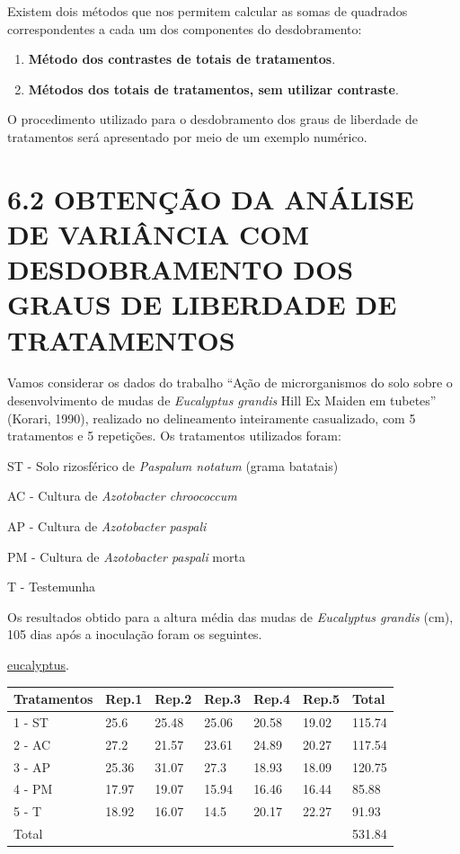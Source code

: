 \documentclass[
]{book}
\providecommand{\tightlist}{%
  \setlength{\itemsep}{0pt}\setlength{\parskip}{0pt}}
\begin{document}
Existem dois métodos que nos permitem calcular as somas de quadrados correspondentes a cada um dos componentes do desdobramento:

\begin{enumerate}
\def\labelenumi{\arabic{enumi}.}
\tightlist
\item
  \textbf{Método dos contrastes de totais de tratamentos}.
\item
  \textbf{Métodos dos totais de tratamentos, sem utilizar contraste}.
\end{enumerate}

O procedimento utilizado para o desdobramento dos graus de liberdade de tratamentos será apresentado por meio de um exemplo numérico.

\hypertarget{obtenuxe7uxe3o-da-anuxe1lise-de-variuxe2ncia-com-desdobramento-dos-graus-de-liberdade-de-tratamentos}{%
\section{6.2 OBTENÇÃO DA ANÁLISE DE VARIÂNCIA COM DESDOBRAMENTO DOS GRAUS DE LIBERDADE DE TRATAMENTOS}\label{obtenuxe7uxe3o-da-anuxe1lise-de-variuxe2ncia-com-desdobramento-dos-graus-de-liberdade-de-tratamentos}}

Vamos considerar os dados do trabalho ``Ação de microrganismos do solo sobre o desenvolvimento de mudas de \emph{Eucalyptus grandis} Hill Ex Maiden em tubetes'' (Korari, 1990), realizado no delineamento inteiramente casualizado, com 5 tratamentos e 5 repetições. Os tratamentos utilizados foram:

ST - Solo rizosférico de \emph{Paspalum notatum} (grama batatais)

AC - Cultura de \emph{Azotobacter chroococcum}

AP - Cultura de \emph{Azotobacter paspali}

PM - Cultura de \emph{Azotobacter paspali} morta

T - Testemunha

Os resultados obtido para a altura média das mudas de \emph{Eucalyptus grandis} (cm), 105 dias após a inoculação foram os seguintes.

\href{https://raw.githubusercontent.com/arpanosso/ExpAgr_2020/master/dados/eucalyptus.txt}{eucalyptus}.

\begin{table}[H]
\centering
\begin{tabular}{l|l|l|l|l|l|l}
\hline
Tratamentos & Rep.1 & Rep.2 & Rep.3 & Rep.4 & Rep.5 & Total\\
\hline
1 - ST & 25.6 & 25.48 & 25.06 & 20.58 & 19.02 & 115.74\\
\hline
2 - AC & 27.2 & 21.57 & 23.61 & 24.89 & 20.27 & 117.54\\
\hline
3 - AP & 25.36 & 31.07 & 27.3 & 18.93 & 18.09 & 120.75\\
\hline
4 - PM & 17.97 & 19.07 & 15.94 & 16.46 & 16.44 & 85.88\\
\hline
5 - T & 18.92 & 16.07 & 14.5 & 20.17 & 22.27 & 91.93\\
\hline
Total &  &  &  &  &  & 531.84\\
\hline
\end{tabular}
\end{table}
\end{document}
